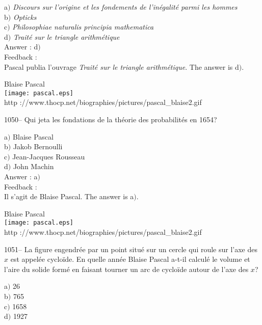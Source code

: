 ﻿\documentclass[letterpaper, 12pt]{article}
\begin{document}
a$)$ {\sl Discours sur l'origine et les fondements de l'in\'egalit\'e parmi
les hommes} \\
b$)$ {\sl Opticks}  \\
c$)$ {\sl Philosophiae naturalis principia mathematica}  \\
d$)$ {\sl Trait\'e sur le triangle arithm\'etique}\\

Answer : d$)$\\

Feedback : \\
Pascal publia l'ouvrage {\sl Trait\'e sur le triangle
arithm\'etique}.
The answer is d$)$.\\

        \begin{center}
        Blaise Pascal\\
    \texttt{[image: pascal.eps]}\\
        {\footnotesize http
://www.thocp.net/biographies/pictures/pascal\_blaise2.gif}
    \end{center}

1050-- Qui jeta les fondations de la th\'eorie des probabilit\'es en
1654?

a$)$ Blaise Pascal \\
b$)$ Jakob Bernoulli  \\
c$)$ Jean-Jacques Rousseau \\
d$)$ John Machin\\

Answer : a$)$\\

Feedback : \\
Il s'agit de Blaise Pascal.
The answer is a$)$.\\

        \begin{center}
        Blaise Pascal\\
    \texttt{[image: pascal.eps]}\\
        {\footnotesize http
://www.thocp.net/biographies/pictures/pascal\_blaise2.gif}
    \end{center}

1051-- La figure engendr\'ee par un point situ\'e sur un cercle qui
roule sur l'axe des $x$ est appel\'ee cyclo\"ide. En quelle ann\'ee
Blaise Pascal a-t-il calcul\'e le volume et l'aire du solide form\'e
en faisant tourner un arc de cyclo\"ide autour de l'axe des $x$?

a$)$ 26 \\
b$)$ 765  \\
c$)$ 1658  \\
d$)$ 1927\\
\end{document}
